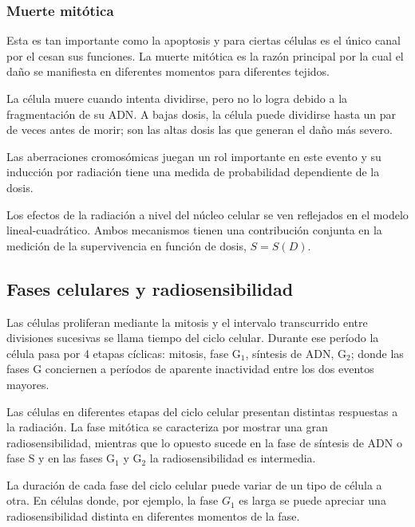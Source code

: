 \documentclass[12pt,letterpaper, oneside]{book}
\begin{document}
			\subsubsection{Muerte mitótica}
			Esta es tan importante como la apoptosis y para ciertas células es el único canal por el cesan sus funciones\cite{Hall.2000}. La muerte mitótica es la razón principal por la cual el daño se manifiesta en diferentes momentos para diferentes tejidos\cite{Bleehen.2007}. 
			
			La célula muere cuando intenta dividirse, pero no lo logra debido a la fragmentación de su ADN\cite{Hall.2000, Bleehen.2007}. A bajas dosis, la célula puede dividirse hasta un par de veces antes de morir; son las altas dosis las que generan el daño más severo\cite{Bleehen.2007}. 
			
			Las aberraciones cromosómicas juegan un rol importante en este evento y su inducción por radiación tiene una medida de probabilidad dependiente de la dosis\cite{Hall.2000}. 
			
			Los efectos de la radiación a nivel del núcleo celular se ven reflejados en el modelo lineal-cuadrático. Ambos mecanismos tienen una contribución conjunta en la medición de la supervivencia en función de dosis, $S=S(D)$\cite{Hall.2000}.
			
		\subsection{Fases celulares y radiosensibilidad}
		Las células proliferan mediante la mitosis y el intervalo transcurrido entre divisiones sucesivas se llama tiempo del ciclo celular\cite{Hall.2000}. Durante ese período la célula pasa por 4 etapas cíclicas: mitosis, fase $\textrm{G}_1$, síntesis de ADN, $\textrm{G}_2$; donde las fases G conciernen a períodos de aparente inactividad entre los dos eventos mayores\cite{Hall.2000}.
		
		Las células en diferentes etapas del ciclo celular presentan distintas respuestas a la radiación\cite{Bleehen.2007, Tubiana.1990}. La fase mitótica se caracteriza por mostrar una gran radiosensibilidad, mientras que lo opuesto sucede en la fase de síntesis de ADN o fase S y en las fases $\textrm{G}_1$ y $\textrm{G}_2$ la radiosensibilidad es intermedia\cite{Bleehen.2007}. 
		
		La duración de cada fase del ciclo celular puede variar de un tipo de célula a otra\cite{Hall.2000, Bleehen.2007}. En células donde, por ejemplo, la fase $G_1$ es larga se puede apreciar una radiosensibilidad distinta en diferentes momentos de la fase\cite{Bleehen.2007}.	
		
\end{document}
